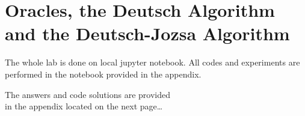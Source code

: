 \documentclass[a4paper, 10pt]{article}
\begin{document}
\subject
{}

\section{Oracles, the Deutsch Algorithm and the Deutsch-Jozsa Algorithm}

The whole lab is done on local jupyter notebook.
All codes and experiments are performed in the notebook provided in the appendix.

\myspace

\begin{flushright}
	The answers and code solutions are provided \\
	in the appendix located on the next page\dots
\end{flushright}



\end{document}
